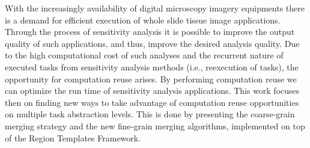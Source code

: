 With the increasingly availability of digital microscopy imagery equipments there is a demand for efficient execution of whole slide tissue image applications. Through the process of sensitivity analysis it is possible to improve the output quality of such applications, and thus, improve the desired analysis quality. Due to the high computational cost of such analyses and the recurrent nature of executed tasks from sensitivity analysis methods (i.e., reexecution of tasks), the opportunity for computation reuse arises. By performing computation reuse we can optimize the run time of sensitivity analysis applications. This work focuses then on finding new ways to take advantage of computation reuse opportunities on multiple task abstraction levels. This is done by presenting the coarse-grain merging strategy and the new fine-grain merging algorithms, implemented on top of the Region Templates Framework.